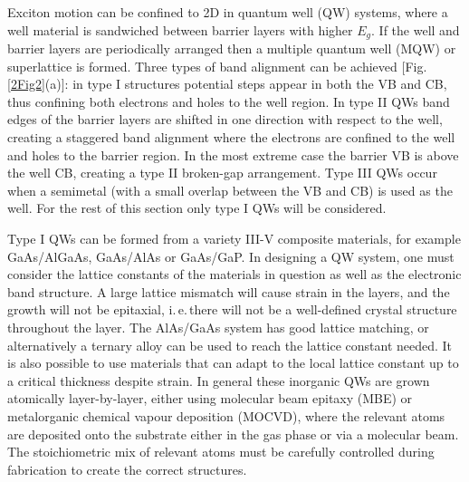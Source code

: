 Exciton motion can be confined to 2D in quantum well (QW) systems, where a well material is sandwiched between barrier layers with higher $E_g$. If the well and barrier layers are periodically arranged then a multiple quantum well (MQW) or superlattice is formed. Three types of band alignment can be achieved [Fig.\,\ref{2Fig2}(a)]: in type I structures potential steps appear in both the VB and CB, thus confining both electrons and holes to the well region. In type II QWs band edges of the barrier layers are shifted in one direction with respect to the well, creating a staggered band alignment where the electrons are confined to the well and holes to the barrier region. In the most extreme case the barrier VB is above the well CB, creating a type II broken-gap arrangement. Type III QWs occur when a semimetal (with a small overlap between the VB and CB) is used as the well. For the rest of this section only type I QWs will be considered.

Type I QWs can be formed from a variety III-V composite materials, for example GaAs/AlGaAs, GaAs/AlAs or GaAs/GaP. In designing a QW system, one must consider the lattice constants of the materials in question as well as the electronic band structure. A large lattice mismatch will cause strain in the layers, and the growth will not be epitaxial, i.\,e.\,there will not be a well-defined crystal structure throughout the layer. The AlAs/GaAs system has good lattice matching, or alternatively a ternary alloy can be used to reach the lattice constant needed. It is also possible to use materials that can adapt to the local lattice constant up to a critical thickness despite strain. In general these inorganic QWs are grown atomically layer-by-layer, either using molecular beam epitaxy (MBE) or metalorganic chemical vapour deposition (MOCVD), where the relevant atoms are deposited onto the substrate either in the gas phase or via a molecular beam. The stoichiometric mix of relevant atoms must be carefully controlled during fabrication to create the correct structures. 

